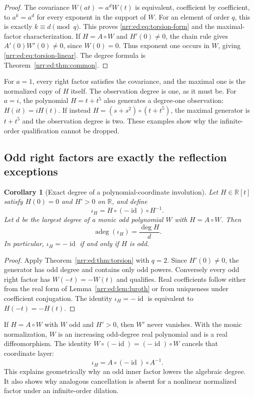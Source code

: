 \documentclass[11pt,letterpaper]{article}
\newtheorem{corollary}[theorem]{Corollary}
\theoremstyle{definition}
\theoremstyle{remark}
\newcommand{\R}{\mathbb R}
\newcommand{\id}{\operatorname{id}}
\newcommand{\algdeg}{\operatorname{adeg}}
\begin{document}
\begin{proof}
The covariance $W(at)=a^dW(t)$ is equivalent, coefficient by coefficient, to
$a^k=a^d$ for every exponent in the support of $W$. For an element of order $q$,
this is exactly $k\equiv d\pmod q$. This proves \eqref{nrr:ed:eq:torsion-form} and the
maximal-factor characterization. If $H=A\circ W$ and $H'(0)\ne0$, the chain rule
gives $A'(0)W'(0)\ne0$, since $W(0)=0$. Thus exponent one occurs in $W$, giving
\eqref{nrr:ed:eq:torsion-linear}. The degree formula is Theorem~\ref{nrr:ed:thm:common}.
\end{proof}

For $a=1$, every right factor satisfies the covariance, and the maximal one is
the normalized copy of $H$ itself. The observation degree is one, as it must be.
For $a=i$, the polynomial $H=t+t^5$ also generates a degree-one observation:
$H(it)=iH(t)$. If instead $H=(s+s^2)\circ(t+t^5)$, the maximal generator is
$t+t^5$ and the observation degree is two. These examples show why the
infinite-order qualification cannot be dropped.

\subsection{Odd right factors are exactly the reflection exceptions}

\begin{corollary}[Exact degree of a polynomial-coordinate involution]
\label{nrr:ed:cor:odd-factor}
Let $H\in\R[t]$ satisfy $H(0)=0$ and $H'>0$ on $\R$, and define
\[
 \iota_H=H\circ(-\id)\circ H^{-1}.
\]
Let $d$ be the largest degree of a monic odd polynomial $W$ with $H=A\circ W$.
Then
\begin{equation}
 \algdeg(\iota_H)=\frac{\deg H}{d}.
 \label{nrr:ed:eq:involution-degree}
\end{equation}
In particular, $\iota_H=-\id$ if and only if $H$ is odd.
\end{corollary}

\begin{proof}
Apply Theorem~\ref{nrr:ed:thm:torsion} with $q=2$. Since $H'(0)\ne0$, the generator has
odd degree and contains only odd powers. Conversely every odd right factor has
$W(-t)=-W(t)$ and qualifies. Real coefficients follow either from the real form
of Lemma~\ref{nrr:ed:lem:luroth} or from uniqueness under coefficient conjugation.
The identity $\iota_H=-\id$ is equivalent to $H(-t)=-H(t)$.
\end{proof}

If $H=A\circ W$ with $W$ odd and $H'>0$, then $W'$ never vanishes. With the
monic normalization, $W$ is an increasing odd-degree real polynomial and is a
real diffeomorphism. The identity $W\circ(-\id)=(-\id)\circ W$ cancels that
coordinate layer:
\[
 \iota_H=A\circ(-\id)\circ A^{-1}.
\]
This explains geometrically why an odd inner factor lowers the algebraic degree.
It also shows why analogous cancellation is absent for a nonlinear normalized
factor under an infinite-order dilation.
\end{document}
